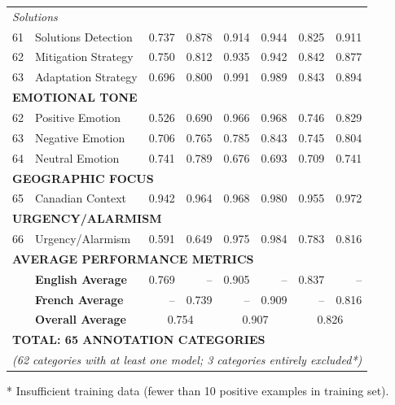 {\begin{longtable}{p{0.4cm}p{5.5cm}rrrrrr}
\multicolumn{8}{l}{\textit{Solutions}} \\
61 & Solutions Detection & 0.737 & 0.878 & 0.914 & 0.944 & 0.825 & 0.911 \\
62 & Mitigation Strategy & 0.750 & 0.812 & 0.935 & 0.942 & 0.842 & 0.877 \\
63 & Adaptation Strategy & 0.696 & 0.800 & 0.991 & 0.989 & 0.843 & 0.894 \\
\multicolumn{8}{l}{\cellcolor{gray!10}\textbf{EMOTIONAL TONE}} \\
\midrule
62 & Positive Emotion & 0.526 & 0.690 & 0.966 & 0.968 & 0.746 & 0.829 \\
63 & Negative Emotion & 0.706 & 0.765 & 0.785 & 0.843 & 0.745 & 0.804 \\
64 & Neutral Emotion & 0.741 & 0.789 & 0.676 & 0.693 & 0.709 & 0.741 \\
\multicolumn{8}{l}{\cellcolor{gray!10}\textbf{GEOGRAPHIC FOCUS}} \\
\midrule
65 & Canadian Context & 0.942 & 0.964 & 0.968 & 0.980 & 0.955 & 0.972 \\
\multicolumn{8}{l}{\cellcolor{gray!10}\textbf{URGENCY/ALARMISM}} \\
\midrule
66 & Urgency/Alarmism & 0.591 & 0.649 & 0.975 & 0.984 & 0.783 & 0.816 \\
\multicolumn{8}{l}{\cellcolor{gray!20}\textbf{AVERAGE PERFORMANCE METRICS}} \\
& \textbf{English Average} & 0.769 & -- & 0.905 & -- & 0.837 & -- \\
& \textbf{French Average} & -- & 0.739 & -- & 0.909 & -- & 0.816 \\
& \textbf{Overall Average} & \multicolumn{2}{c}{0.754} & \multicolumn{2}{c}{0.907} & \multicolumn{2}{c}{0.826} \\
\midrule
\multicolumn{8}{l}{\cellcolor{gray!20}\textbf{TOTAL: 65 ANNOTATION CATEGORIES}} \\
\multicolumn{8}{l}{\cellcolor{gray!20}\textit{(62 categories with at least one model; 3 categories entirely excluded*)}} \\
\end{longtable}
\vspace{0.5em}
\noindent\footnotesize
* Insufficient training data (fewer than 10 positive examples in training set).
} %
